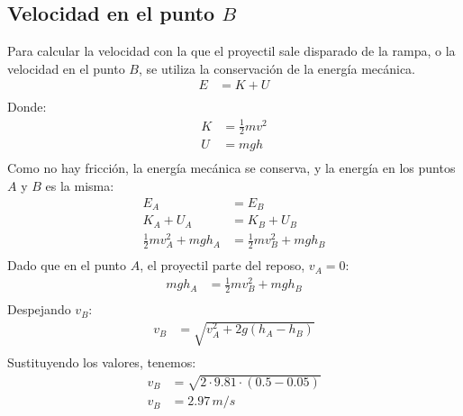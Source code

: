 \documentclass{article}
\begin{document}
        \subsection{Velocidad en el punto $B$}
        Para calcular la velocidad con la que el proyectil sale disparado de la rampa, o la velocidad en el punto $B$,
        se utiliza la conservación de la energía mecánica.
        \begin{align*}
            E &= K + U \\
        \end{align*}
        Donde:
        \begin{align*}
            K &= \frac{1}{2} m v^2 \\
            U &= m g h \\
        \end{align*}
        Como no hay fricción, la energía mecánica se conserva, y la energía en los puntos $A$ y $B$ es la misma:
        \begin{align*}
            E_A &= E_B \\
            K_A + U_A &= K_B + U_B \\
            \frac{1}{2} m v_A^2 + m g h_A &= \frac{1}{2} m v_B^2 + m g h_B \\
        \end{align*}
        Dado que en el punto $A$, el proyectil parte del reposo, $v_A = 0$:
        \begin{align*}
            m g h_A &= \frac{1}{2} m v_B^2 + m g h_B \\
        \end{align*}
        Despejando $v_B$:
        \begin{align*}
            v_B &= \sqrt{v_A^2 + 2 g (h_A - h_B)} \\
        \end{align*}
        Sustituyendo los valores, tenemos:
        \begin{align*}
            v_B &= \sqrt{2 \cdot 9.81 \cdot (0.5 - 0.05)} \\
            v_B &= 2.97 \, \si{m/s} \\
        \end{align*}
        
\end{document}
